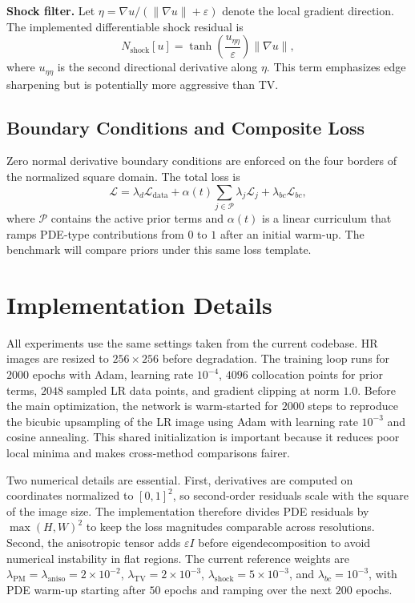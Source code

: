 \documentclass[conference]{IEEEtran}
\newcommand{\grad}{\nabla}
\newcommand{\loss}{\mathcal{L}}
\begin{document}
\textbf{Shock filter.} Let
$\eta = \grad u / (\|\grad u\| + \varepsilon)$ denote the local gradient
direction. The implemented differentiable shock residual is
\begin{equation}
    N_{\mathrm{shock}}[u] =
    \tanh\!\left(\frac{u_{\eta\eta}}{\varepsilon}\right)\|\grad u\|,
    \label{eq:shock}
\end{equation}
where $u_{\eta\eta}$ is the second directional derivative along
$\eta$. This term emphasizes edge sharpening but is potentially more
aggressive than TV.

\subsection{Boundary Conditions and Composite Loss}
Zero normal derivative boundary conditions are enforced on the four
borders of the normalized square domain. The total loss is
\begin{equation}
    \loss =
    \lambda_d \loss_{\mathrm{data}} +
    \alpha(t)\!\!\sum_{j \in \mathcal{P}}\!\!\lambda_j \loss_j +
    \lambda_{bc}\loss_{bc},
    \label{eq:total}
\end{equation}
where $\mathcal{P}$ contains the active prior terms and $\alpha(t)$ is
a linear curriculum that ramps PDE-type contributions from $0$ to $1$
after an initial warm-up. The benchmark will compare priors under this
same loss template.

\section{Implementation Details}
All experiments use the same settings taken from the current codebase.
HR images are resized to $256 \times 256$ before degradation. The
training loop runs for $2000$ epochs with Adam, learning rate
$10^{-4}$, $4096$ collocation points for prior terms, $2048$ sampled LR
data points, and gradient clipping at norm $1.0$. Before the main
optimization, the network is warm-started for $2000$ steps to reproduce
the bicubic upsampling of the LR image using Adam with learning rate
$10^{-3}$ and cosine annealing. This shared initialization is important
because it reduces poor local minima and makes cross-method comparisons
fairer.

Two numerical details are essential. First, derivatives are computed on
coordinates normalized to $[0,1]^2$, so second-order residuals scale
with the square of the image size. The implementation therefore divides
PDE residuals by $\max(H,W)^2$ to keep the loss magnitudes comparable
across resolutions. Second, the anisotropic tensor adds
$\varepsilon I$ before eigendecomposition to avoid numerical
instability in flat regions. The current reference weights are
$\lambda_{\mathrm{PM}} = \lambda_{\mathrm{aniso}} = 2 \times 10^{-2}$,
$\lambda_{\mathrm{TV}} = 2 \times 10^{-3}$,
$\lambda_{\mathrm{shock}} = 5 \times 10^{-3}$, and
$\lambda_{bc} = 10^{-3}$, with PDE warm-up starting after $50$ epochs
and ramping over the next $200$ epochs.
\end{document}
